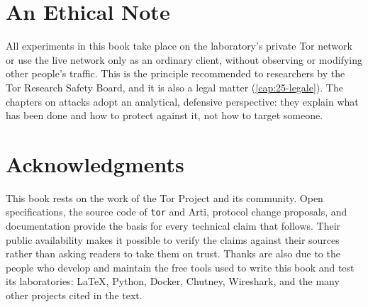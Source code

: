 \section*{An Ethical Note}

All experiments in this book take place on the laboratory's private Tor network or use the live network only as an ordinary client, without observing or modifying other people's traffic. This is the principle recommended to researchers by the Tor Research Safety Board, and it is also a legal matter (\cref{cap:25-legale}). The chapters on attacks adopt an analytical, defensive perspective: they explain what has been done and how to protect against it, not how to target someone.

\section*{Acknowledgments}

This book rests on the work of the Tor Project and its community. Open specifications, the source code of \texttt{tor} and Arti, protocol change proposals, and documentation provide the basis for every technical claim that follows. Their public availability makes it possible to verify the claims against their sources rather than asking readers to take them on trust. Thanks are also due to the people who develop and maintain the free tools used to write this book and test its laboratories: \LaTeX{}, Python, Docker, Chutney, Wireshark, and the many other projects cited in the text.
